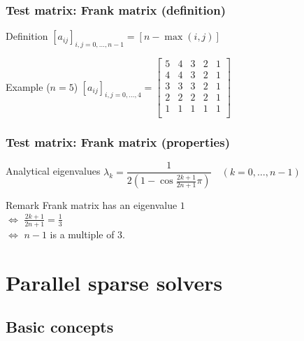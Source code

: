 \begin{frame}[c,fragile]
  \frametitle{Test matrix: Frank matrix (definition)}
\begin{block}{Definition}
$[a_{ij}]_{i,j = {0, \dots, n-1}} = [ n - \max(i,j) ]$\\
\end{block}

\begin{block}{Example ($n=5$)}
$[a_{ij}]_{i,j = {0, \dots, 4}} =
\begin{bmatrix}
5 & 4 & 3 & 2 & 1 \\
4 & 4 & 3 & 2 & 1 \\
3 & 3 & 3 & 2 & 1 \\
2 & 2 & 2 & 2 & 1 \\
1 & 1 & 1 & 1 & 1 \\
\end{bmatrix}
$
\end{block}
\end{frame}

\begin{frame}[c,fragile]
  \frametitle{Test matrix: Frank matrix (properties)}
\begin{block}{Analytical eigenvalues}%
$\lambda_k = \dfrac{1}{2 \left( 1 - \cos{\tfrac{2 k + 1}{2 n + 1}\pi} \right)} \quad (k=0,\dots,n-1)$
\end{block}

\begin{block}{Remark}%
Frank matrix has an eigenvalue $1$\\
\quad $\Longleftrightarrow$ $\tfrac{2 k + 1}{2 n + 1} = \tfrac{1}{3}$\\
\quad $\Longleftrightarrow$ $n-1$ is a multiple of 3.
\end{block}
\end{frame}

\section{Parallel sparse solvers}

\subsection{Basic concepts}

